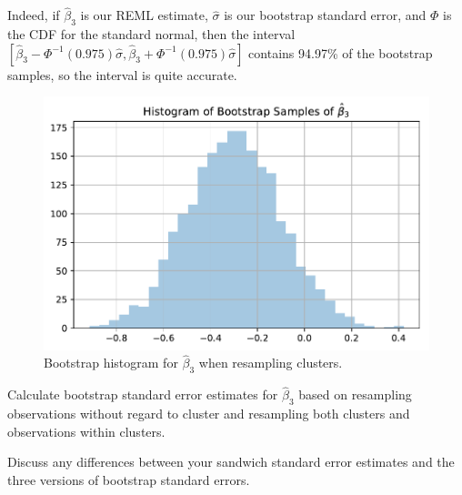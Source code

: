 \documentclass[11pt, letterpaper]{article}
\begin{document}
\begin{enumerate}[(a)]
\begin{description}
  Indeed, if $\hat{\beta}_3$ is our REML estimate, $\hat{\sigma}$ is our
  bootstrap standard error, and $\Phi$ is the CDF for the standard normal, then
  the interval
  $\left[\hat{\beta}_3 - \Phi^{-1}\left(0.975\right)\hat{\sigma}, \hat{\beta}_3
    + \Phi^{-1}\left(0.975\right)\hat{\sigma}\right]$ contains 94.97\% of the
  bootstrap samples, so the interval is quite accurate.
\end{description}

\begin{figure}
  \centering
  \includegraphics{hist_bootstrap_cluster.pdf}
  \caption{Bootstrap histogram for $\hat\beta_3$ when resampling clusters.}
  \label{fig:hist_bootstrap_cluster}
\end{figure}

{ \em \item Calculate bootstrap standard error estimates for $\hat{\beta}_3$ based on resampling observations
without regard to cluster and resampling both clusters and observations within clusters. }
{\em \item Discuss any differences between your sandwich standard error estimates and the three versions of bootstrap standard errors.}
\end{enumerate} 
\end{document}
